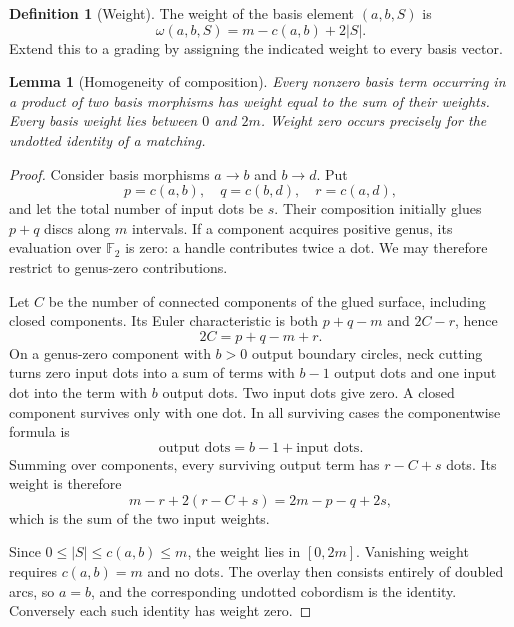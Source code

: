 \documentclass[11pt]{article}
\newtheorem{lemma}[theorem]{Lemma}
\theoremstyle{definition}\newtheorem{definition}[theorem]{Definition}
\theoremstyle{remark}\newtheorem{remark}[theorem]{Remark}
\newcommand{\F}{\mathbb F_2}
\begin{document}
\begin{definition}[Weight]
The weight of the basis element $(a,b,S)$ is
\begin{equation}
 \omega(a,b,S)=m-c(a,b)+2|S|.\label{eq:weight}
\end{equation}
Extend this to a grading by assigning the indicated weight to every basis vector.
\end{definition}

\begin{lemma}[Homogeneity of composition]\label{lem:weight}
Every nonzero basis term occurring in a product of two basis morphisms has weight equal to the sum of their weights. Every basis weight lies between $0$ and $2m$. Weight zero occurs precisely for the undotted identity of a matching.
\end{lemma}
\begin{proof}
Consider basis morphisms $a\to b$ and $b\to d$. Put
\[
 p=c(a,b),\quad q=c(b,d),\quad r=c(a,d),
\]
and let the total number of input dots be $s$. Their composition initially glues $p+q$ discs along $m$ intervals. If a component acquires positive genus, its evaluation over $\F$ is zero: a handle contributes twice a dot. We may therefore restrict to genus-zero contributions.

Let $C$ be the number of connected components of the glued surface, including closed components. Its Euler characteristic is both $p+q-m$ and $2C-r$, hence
\begin{equation}
 2C=p+q-m+r.\label{eq:euler}
\end{equation}
On a genus-zero component with $b>0$ output boundary circles, neck cutting turns zero input dots into a sum of terms with $b-1$ output dots and one input dot into the term with $b$ output dots. Two input dots give zero. A closed component survives only with one dot. In all surviving cases the componentwise formula is
\[
 \text{output dots}=b-1+\text{input dots}.
\]
Summing over components, every surviving output term has $r-C+s$ dots. Its weight is therefore
\[
 m-r+2(r-C+s)=2m-p-q+2s,
\]
which is the sum of the two input weights.

Since $0\leq |S|\leq c(a,b)\leq m$, the weight lies in $[0,2m]$. Vanishing weight requires $c(a,b)=m$ and no dots. The overlay then consists entirely of doubled arcs, so $a=b$, and the corresponding undotted cobordism is the identity. Conversely each such identity has weight zero.
\end{proof}
\end{document}
